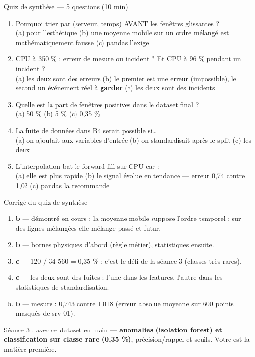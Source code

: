 \begin{frame}{Quiz de synthèse --- 5 questions (10 min)}
\begin{qbox}
\begin{enumerate}
\item Pourquoi trier par (serveur, temps) AVANT les fenêtres glissantes ?\\
(a) pour l'esthétique \quad (b) une moyenne mobile sur un ordre mélangé
est mathématiquement fausse \quad (c) pandas l'exige
\item CPU à 350 \% : erreur de mesure ou incident ? Et CPU à 96 \% pendant
un incident ?\\
(a) les deux sont des erreurs \quad (b) le premier est une erreur
(impossible), le second un événement réel à \textbf{garder} \quad (c) les
deux sont des incidents
\item Quelle est la part de fenêtres positives dans le dataset final ?\\
(a) 50 \% \quad (b) 5 \% \quad (c) 0,35 \%
\item La fuite de données dans B4 serait possible si\ldots\\
(a) on ajoutait  aux variables d'entrée \quad (b) on standardisait
après le split \quad (c) les deux
\item L'interpolation bat le forward-fill sur CPU car :\\
(a) elle est plus rapide \quad (b) le signal évolue en tendance --- erreur
0,74 contre 1,02 \quad (c) pandas la recommande
\end{enumerate}
\end{qbox}
\end{frame}

\begin{frame}{Corrigé du quiz de synthèse}
\begin{solbox}
\begin{enumerate}
\item \textbf{b} --- démontré en cours : la moyenne mobile suppose l'ordre
temporel ; sur des lignes mélangées elle mélange passé et futur.
\item \textbf{b} --- bornes physiques d'abord (règle métier), statistiques ensuite.
\item \textbf{c} --- 120 / 34 560 = 0,35 \% : c'est le défi de la séance 3
(classes très rares).
\item \textbf{c} --- les deux sont des fuites : l'une dans les features,
l'autre dans les statistiques de standardisation.
\item \textbf{b} --- mesuré : 0,743 contre 1,018 (erreur absolue moyenne sur
600 points masqués de srv-01).
\end{enumerate}
\end{solbox}
\begin{kbox}
Séance 3 : avec ce dataset en main --- \textbf{anomalies (isolation forest)
et classification sur classe rare (0,35 \%)}, précision/rappel et seuils.
Votre  est la matière première.
\end{kbox}
\end{frame}

